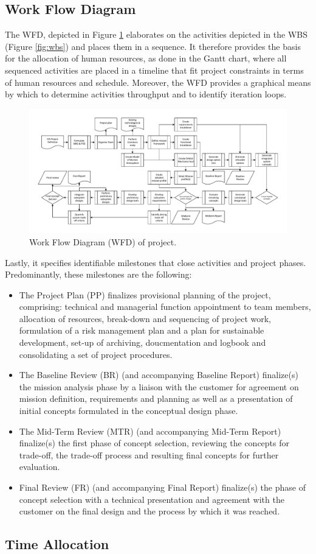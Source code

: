 \subsection{Work Flow Diagram}\label{sec:WFD}
The WFD, depicted in Figure \ref{fig:wfd} elaborates on the activities depicted in the WBS (Figure \ref{fig:wbs}) and places them in a sequence. It therefore provides the basis for the allocation of human resources, as done in the Gantt chart, where all sequenced activities are placed in a timeline that fit project constraints in terms of human resources and schedule. Moreover, the WFD provides a graphical means by which to determine activities throughput and to identify iteration loops. 

\begin{figure}
    \includegraphics{Figure/WFD2.pdf}
    \caption{Work Flow Diagram (WFD) of project.}
    \label{fig:wfd}
\end{figure}

Lastly, it specifies identifiable milestones that close activities and project phases. Predominantly, these milestones are the following:
\begin{itemize}
\item The Project Plan (PP) finalizes provisional planning of the project, comprising: technical and managerial function appointment to team members, allocation of resources, break-down and sequencing of project work, formulation of a risk management plan and a plan for sustainable development, set-up of archiving, doucmentation and logbook and consolidating a set of project procedures.
\item The Baseline Review (BR) (and accompanying Baseline Report) finalize(s) the mission analysis phase by a liaison with the customer for agreement on mission definition, requirements and planning as well as a presentation of initial concepts formulated in the conceptual design phase.
\item The Mid-Term Review (MTR) (and accompanying Mid-Term Report) finalize(s) the first phase of concept selection, reviewing the concepts for trade-off, the trade-off process and resulting final concepts for further evaluation.
\item Final Review (FR) (and accompanying Final Report) finalize(s) the phase of concept selection with a technical presentation and agreement with the customer on the final design and the process by which it was reached. 
\end{itemize}

\subsection{Time Allocation}\label{sec:timeallocation}



